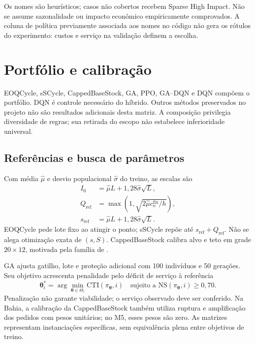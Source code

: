 Os nomes são heurísticos; casos não cobertos recebem Sparse High Impact. Não se assume sazonalidade ou impacto econômico empiricamente comprovados. A coluna de política previamente associada aos nomes no código não gera os rótulos do experimento: custos e serviço na validação definem a escolha.

\section{Portfólio e calibração}
\label{sec:benchmark_massivo}\label{sec:portfolio_ampliado}
EOQCycle, sSCycle, CappedBaseStock, GA, PPO, GA--DQN e DQN compõem o portfólio. DQN é controle necessário do híbrido. Outros métodos preservados no projeto não são resultados adicionais desta matriz. A composição privilegia diversidade de regras; sua retirada do escopo não estabelece inferioridade universal.

\subsection{Referências e busca de parâmetros}
\label{sec:sinais_previsao}\label{sec:redundancia_portfolio}
Com média $\hat\mu$ e desvio populacional $\hat\sigma$ do treino, as escalas são
\begin{align}
 I_0&=\hat\mu L+1{,}28\hat\sigma\sqrt L,\label{eq:I0_metod}\\
 Q_{\mathrm{ref}}&=\max(1,\sqrt{2\hat\mu c_o^{\mathrm{fix}}/h}),\label{eq:qref_metod}\\
 s_{\mathrm{ref}}&=\hat\mu L+1{,}28\hat\sigma\sqrt L.\label{eq:sref_metod}
\end{align}
EOQCycle pede lote fixo ao atingir o ponto; sSCycle repõe até $s_{\mathrm{ref}}+Q_{\mathrm{ref}}$. Não se alega otimização exata de $(s,S)$. CappedBaseStock calibra alvo e teto em grade $20\times12$, motivada pela família de \citet{Xin2021CappedBaseStock}.

GA ajusta gatilho, lote e proteção adicional com 100 indivíduos e 50 gerações. Seu objetivo acrescenta penalidade pelo déficit de serviço à referência
\begin{equation}
 \boldsymbol\theta_i^*=\arg\min_{\boldsymbol\theta\in\Theta_i}\mathrm{CTI}(\pi_{\boldsymbol\theta},i)
 \quad\text{sujeito a }\mathrm{NS}(\pi_{\boldsymbol\theta},i)\geq0{,}70.
 \label{eq:obj_metaheuristicas}
\end{equation}
Penalização não garante viabilidade; o serviço observado deve ser conferido. Na Bahia, a calibração da CappedBaseStock também utiliza ruptura e amplificação dos pedidos com pesos unitários; no M5, esses pesos são zero. As matrizes representam instanciações específicas, sem equivalência plena entre objetivos de treino.

